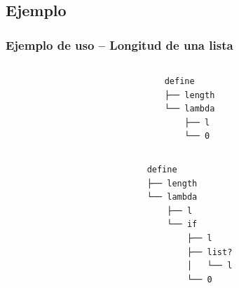 \documentclass[xcolor=x11names,compress]{beamer}
\renewcommand{\(}{\begin{columns}}
\renewcommand{\)}{\end{columns}}
\newcommand{\<}[1]{\begin{column}{#1}}
\renewcommand{\>}{\end{column}}
\begin{document}
\subsection{Ejemplo}
\begin{frame}[fragile]
    \frametitle{Ejemplo de uso -- Longitud de una lista}\pause
    \begin{columns}
        \begin{column}{.50\linewidth}
        \begin{block}
            \codeLengthExampleA
        \end{block}
        \end{column}\pause
        \begin{column}{.50\linewidth}
        \begin{verbatim}
define
├── length
└── lambda
    ├── l
    └── 0
        \end{verbatim}
        \end{column}
    \end{columns}\pause

    \begin{columns}
        \begin{column}{.50\linewidth}
        \begin{block}
            \codeLengthExampleB
        \end{block}
        \end{column}\pause
        \begin{column}{.50\linewidth}
        \begin{verbatim}
define
├── length
└── lambda
    ├── l
    └── if
        ├── l
        ├── list?
        │   └── l
        └── 0
        \end{verbatim}
        \end{column}
    \end{columns}
\end{frame}

\end{document}
